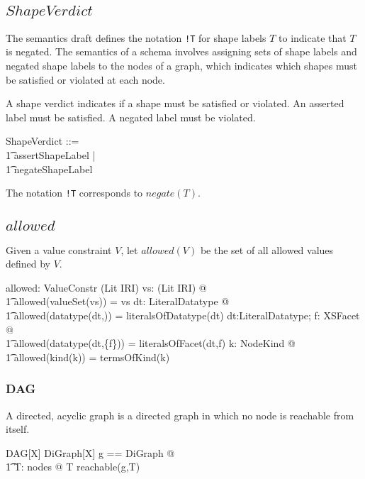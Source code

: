 \documentclass{article}
\begin{document}
\subsection{$ShapeVerdict$}
The semantics draft defines the notation {\tt !T} for shape labels $T$ to indicate that $T$ is negated.
The semantics of a schema involves assigning sets of shape labels and negated shape labels to the nodes of a graph, 
which indicates which shapes must be satisfied or violated at each node. 

A shape verdict indicates if a shape must be satisfied or violated.
An asserted label must be satisfied.
A negated label must be violated.
\begin{zed}
	ShapeVerdict ::= \\
\t1		assert\ldata ShapeLabel \rdata | \\
\t1		negate\ldata ShapeLabel \rdata
\end{zed}

The notation {\tt !T} corresponds to $negate(T)$.

\subsection{$allowed$}
Given a value constraint $V$, let $allowed(V)$ be the set of all allowed values defined by $V$.
\begin{axdef}
	allowed: ValueConstr \fun \power (Lit \cup IRI)
\where
	\forall vs: \power (Lit \cup IRI) @ \\
\t1		allowed(valueSet(vs)) = vs
\also
	\forall dt: LiteralDatatype @ \\
\t1		allowed(datatype(dt,\emptyset)) = literalsOfDatatype(dt)
\also
	\forall dt:LiteralDatatype; f: XSFacet @ \\
\t1		allowed(datatype(dt,\{f\})) = literalsOfFacet(dt,f)
\also
	\forall k: NodeKind @ \\
\t1		allowed(kind(k)) = termsOfKind(k)
\end{axdef}

\subsubsection{DAG}
A directed, acyclic graph is a directed graph in which no node is reachable from itself.
\begin{schema}{DAG}[X]
	 DiGraph[X]
\where
	\LET g == \theta DiGraph @ \\
\t1		\forall T: nodes @ T \notin reachable(g,T)
\end{schema}
\end{document}
